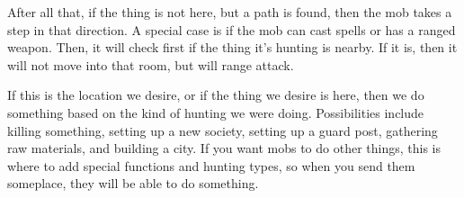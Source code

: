 After all that, if the thing is not here, but a path is found, then
the mob takes a step in that direction. A special case is if the mob
can cast spells or has a ranged weapon. Then, it will check first if
the thing it's hunting is nearby. If it is, then it will not move into
that room, but will range attack.

If this is the location we desire, or if the thing we desire is here,
then we do something based on the kind of hunting we were
doing. Possibilities include killing something, setting up a new
society, setting up a guard post, gathering raw materials, and
building a city. If you want mobs to do other things, this is where to
add special functions and hunting types, so when you send them
someplace, they will be able to do something.
